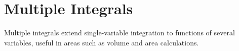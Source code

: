 \chapter{Multiple Integrals}
Multiple integrals extend single-variable integration to functions of several variables, useful in areas such as volume and area calculations.